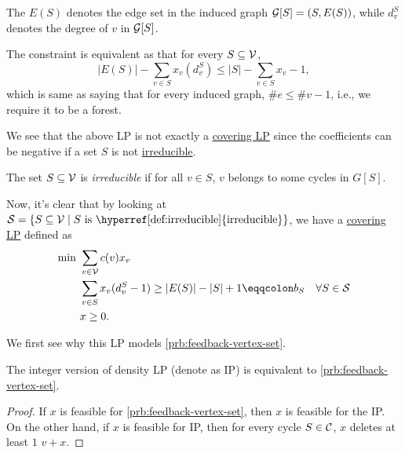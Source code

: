 \begin{notation}
	The \(E(S)\) denotes the edge set in the induced graph \(\mathcal{\MakeUppercase{g}} [S] = (S, E(S))\), while \(d_v^S\) denotes the degree of \(v\) in \(\mathcal{\MakeUppercase{g}} [S]\).
\end{notation}

\begin{intuition}
	The constraint is equivalent as that for every \(S\subseteq \mathcal{\MakeUppercase{v}} \),
	\[
		\left\vert E(S) \right\vert - \sum_{v\in S} x_v(d_v^S)\leq \left\vert S \right\vert - \sum_{v\in S}x_v - 1,
	\]
	which is same as saying that for every induced graph, \(\# e \leq \# v - 1\), i.e., we require it to be a forest.
\end{intuition}

We see that the above LP is not exactly a \hyperref[def:covering-LP]{covering LP} since the coefficients can be negative if a set \(S\) is not \hyperref[def:irreducible]{irreducible}.

\begin{definition}[Irreducible]\label{def:irreducible}
	The set \(S\subseteq \mathcal{\MakeUppercase{v}} \) is \emph{irreducible} if for all \(v\in S\), \(v\) belongs to some cycles in \(G[S]\).
\end{definition}

Now, it's clear that by looking at \(\mathcal{\MakeUppercase{S}} = \left\{ S\subseteq \mathcal{\MakeUppercase{v}} \mid S \text{ is \hyperref[def:irreducible]{irreducible}}\right\} \), we have a \hyperref[def:covering-LP]{covering LP} defined as
\begin{align*}
	\min~ & \sum_{v\in \mathcal{\MakeUppercase{v}} } c(v) x_v                                                                                                          \\
	      & \sum_{v\in S} x_v(d_v^{S} - 1) \geq \left\vert E(S) \right\vert - \left\vert S \right\vert + 1 \eqqcolon b_S\quad \forall S\in \mathcal{\MakeUppercase{S}} \\
	      & x\geq 0.
\end{align*}

We first see why this LP models \autoref{prb:feedback-vertex-set}.

\begin{lemma}\label{lma:lec4-1}
	The integer version of density LP (denote as IP) is equivalent to \autoref{prb:feedback-vertex-set}.
\end{lemma}
\begin{proof}
	If \(x\) is feasible for \autoref{prb:feedback-vertex-set}, then \(x\) is feasible for the IP. On the other hand, if \(x\) is feasible for IP, then for every cycle \(S\in \mathcal{\MakeUppercase{C}} \), \(x\) deletes at least \(1\) \(v + x\).
\end{proof}

